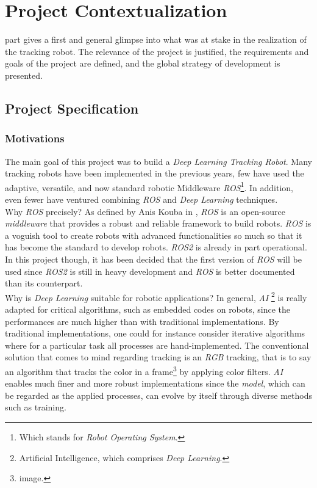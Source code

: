 \clearpage
{}

\chapter{Project Contextualization}\label{context}

	 part gives a first and general glimpse into what was at stake in 
	the realization of the tracking robot. The relevance of the 
	project is justified, the requirements and goals of the project
	are defined, and the global strategy of development is
	presented.

	\section{Project Specification}
	
		\subsection{Motivations}
	
		The main goal of this project was to build a \textit{Deep Learning Tracking Robot}. Many tracking
		robots have been implemented in the previous years, few have used the adaptive, versatile, and 
		now standard robotic Middleware \textit{ROS}\footnote{Which stands for \textit{Robot Operating System}.}.
		In addition, even fewer have ventured combining \textit{ROS} and \textit{Deep Learning} techniques.
		\\\indent Why \textit{ROS} precisely? As defined by Anis Kouba in \cite{ros}, \textit{ROS}
		is an \frstg{} open-source \textit{middleware} \lstg{} that provides a robust and reliable framework 
		to build robots. \textit{ROS} is a voguish tool to create robots with advanced functionalities so much so 
		that it has become the standard to develop robots. \textit{ROS2} is already in part 
		operational. In this project though, 
		it has been decided that the first version of \textit{ROS} will be used since \textit{ROS2} is still 
		in heavy development and \textit{ROS} is better documented than its counterpart.
		\\\indent Why is \textit{Deep Learning} suitable for robotic applications? In general, \textit{AI}
		\footnote{Artificial Intelligence, which comprises \textit{Deep Learning}.}
		is really adapted for critical algorithms, such as embedded codes
		on robots, since the performances are much higher than with traditional implementations. By traditional
		implementations, one could for instance consider iterative algorithms where for a particular task 
		all processes are hand-implemented. The conventional solution 
		that comes to mind regarding tracking is an \textit{RGB} tracking, that is to say an 
		algorithm that tracks the color in a frame\footnote{image.} by applying 
		color filters. \textit{AI} enables much finer and more robust
		implementations since the \textit{model},
		which can be regarded as the applied processes, can evolve by itself through diverse methods such as training.
		 
